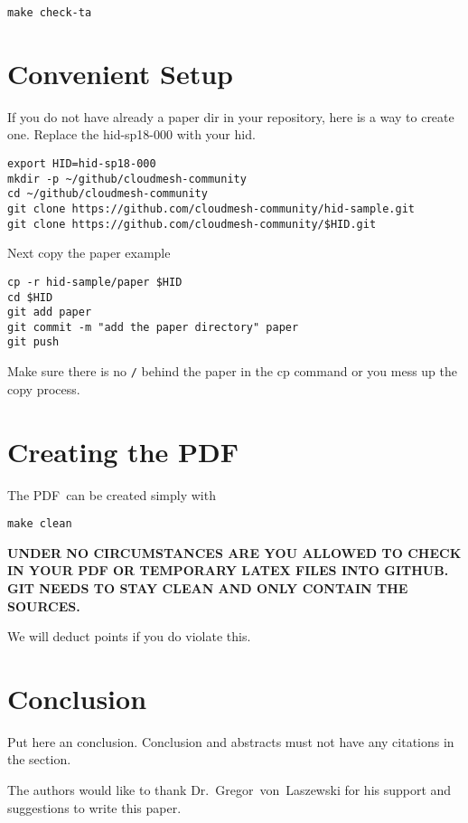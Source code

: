 \begin{verbatim}
make check-ta
\end{verbatim}

\section{Convenient Setup}

If you do not have already a paper dir in your repository, here is a
way to create one. Replace the hid-sp18-000 with your hid.

\begin{verbatim}
export HID=hid-sp18-000
mkdir -p ~/github/cloudmesh-community
cd ~/github/cloudmesh-community
git clone https://github.com/cloudmesh-community/hid-sample.git
git clone https://github.com/cloudmesh-community/$HID.git
\end{verbatim}

Next copy the paper example

\begin{verbatim}
cp -r hid-sample/paper $HID
cd $HID
git add paper
git commit -m "add the paper directory" paper
git push
\end{verbatim}

Make sure there is no \verb|/| behind the paper in the cp command or you mess up the
copy process.


\section{Creating the PDF}

The PDF\ can be created simply with 

\begin{verbatim}
make clean
\end{verbatim}



{\bf UNDER NO CIRCUMSTANCES ARE YOU ALLOWED TO CHECK IN YOUR PDF OR
  TEMPORARY LATEX FILES INTO GITHUB. GIT NEEDS TO STAY CLEAN AND ONLY
  CONTAIN THE SOURCES.}

We will deduct points if you do violate this.

\section{Conclusion}

Put here an conclusion. Conclusion and abstracts must not have any
citations in the section.


\begin{acks}

  The authors would like to thank Dr.~Gregor~von~Laszewski for his
  support and suggestions to write this paper.

\end{acks}


 

